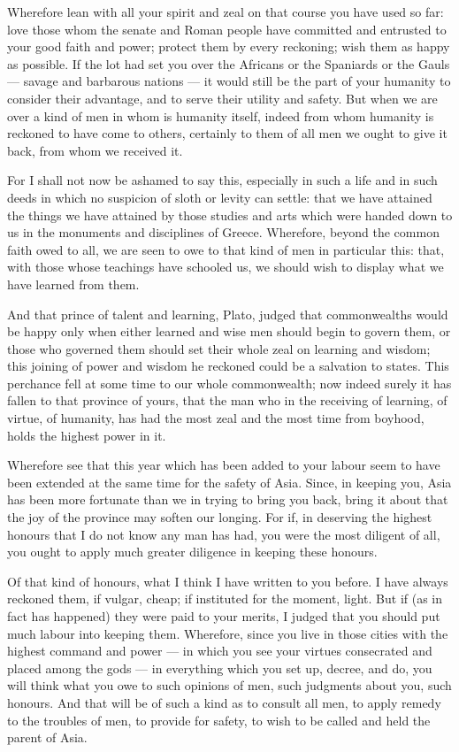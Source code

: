  Wherefore lean with all your spirit and zeal on that course you have used so far: love those whom the senate and Roman people have committed and entrusted to your good faith and power; protect them by every reckoning; wish them as happy as possible. If the lot had set you over the Africans or the Spaniards or the Gauls --- savage and barbarous nations --- it would still be the part of your humanity to consider their advantage, and to serve their utility and safety. But when we are over a kind of men in whom is humanity itself, indeed from whom humanity is reckoned to have come to others, certainly to them of all men we ought to give it back, from whom we received it.

 For I shall not now be ashamed to say this, especially in such a life and in such deeds in which no suspicion of sloth or levity can settle: that we have attained the things we have attained by those studies and arts which were handed down to us in the monuments and disciplines of Greece. Wherefore, beyond the common faith owed to all, we are seen to owe to that kind of men in particular this: that, with those whose teachings have schooled us, we should wish to display what we have learned from them.

 And that prince of talent and learning, Plato, judged that commonwealths would be happy only when either learned and wise men should begin to govern them, or those who governed them should set their whole zeal on learning and wisdom; this joining of power and wisdom he reckoned could be a salvation to states. This perchance fell at some time to our whole commonwealth; now indeed surely it has fallen to that province of yours, that the man who in the receiving of learning, of virtue, of humanity, has had the most zeal and the most time from boyhood, holds the highest power in it.

 Wherefore see that this year which has been added to your labour seem to have been extended at the same time for the safety of Asia. Since, in keeping you, Asia has been more fortunate than we in trying to bring you back, bring it about that the joy of the province may soften our longing. For if, in deserving the highest honours that I do not know any man has had, you were the most diligent of all, you ought to apply much greater diligence in keeping these honours.

 Of that kind of honours, what I think I have written to you before. I have always reckoned them, if vulgar, cheap; if instituted for the moment, light. But if (as in fact has happened) they were paid to your merits, I judged that you should put much labour into keeping them. Wherefore, since you live in those cities with the highest command and power --- in which you see your virtues consecrated and placed among the gods --- in everything which you set up, decree, and do, you will think what you owe to such opinions of men, such judgments about you, such honours. And that will be of such a kind as to consult all men, to apply remedy to the troubles of men, to provide for safety, to wish to be called and held the parent of Asia.

